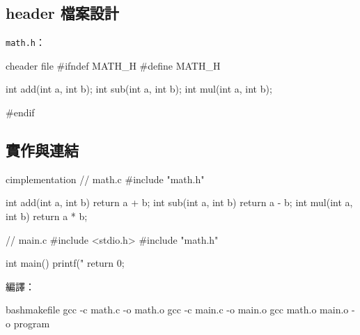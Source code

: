 \subsection*{header 檔案設計}

\texttt{math.h}：

\begin{code}{c}{header file}
#ifndef MATH_H
#define MATH_H

int add(int a, int b);
int sub(int a, int b);
int mul(int a, int b);

#endif
\end{code}

\subsection*{實作與連結}

\begin{code}{c}{implementation}
// math.c
#include "math.h"

int add(int a, int b) { return a + b; }
int sub(int a, int b) { return a - b; }
int mul(int a, int b) { return a * b; }

// main.c
#include <stdio.h>
#include "math.h"

int main() {
    printf("%
    return 0;
}
\end{code}

編譯：

\begin{code}{bash}{makefile}
gcc -c math.c -o math.o
gcc -c main.c -o main.o
gcc math.o main.o -o program
\end{code}

